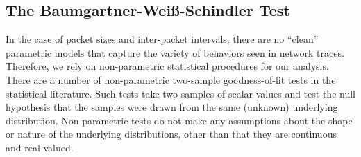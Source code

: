 \documentclass[conference]{IEEEtran}
\newcommand{\caps}[1]{{\small{#1}}}
\begin{document}
\subsection{The Baumgartner-Wei\ss-Schindler Test}



In the case of packet sizes and inter-packet intervals, there are no ``clean'' parametric models that capture the variety of behaviors seen in network traces. Therefore, we rely on non-parametric statistical procedures for our analysis. There are a number of non-parametric two-sample goodness-of-fit tests in the statistical literature. Such tests take two samples of scalar values and test the null hypothesis that the samples were drawn from the same (unknown) underlying distribution. Non-parametric tests do not make any assumptions about the shape or nature of the underlying distributions, other than that they are continuous and real-valued.
\end{document}
